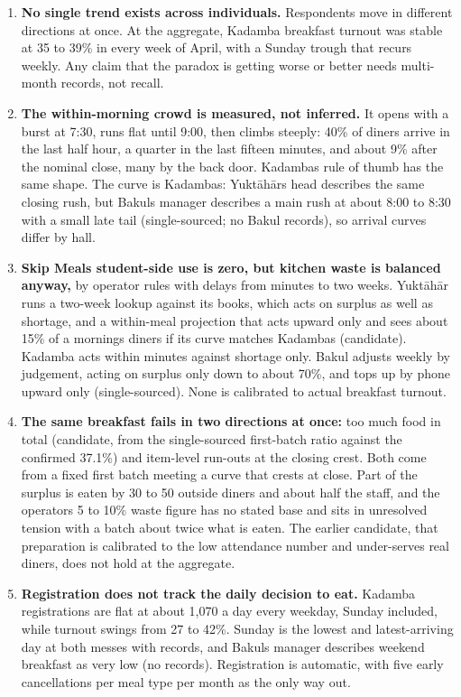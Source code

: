 \documentclass[
  10pt,
  table]{article}
\providecommand{\tightlist}{%
  \setlength{\itemsep}{0pt}\setlength{\parskip}{0pt}}
\renewcommand{\tightlist}{\setlength{\itemsep}{1.5pt}\setlength{\parskip}{0pt}}
\begin{document}
\begin{enumerate}
\def\labelenumi{\arabic{enumi}.}
\tightlist
\item
  \textbf{No single trend exists across individuals.} Respondents move in different directions at once. At the aggregate, Kadamba breakfast turnout was stable at 35 to 39\% in every week of April, with a Sunday trough that recurs weekly. Any claim that the paradox is getting worse or better needs multi-month records, not recall.
\item
  \textbf{The within-morning crowd is measured, not inferred.} It opens with a burst at 7:30, runs flat until 9:00, then climbs steeply: 40\% of diners arrive in the last half hour, a quarter in the last fifteen minutes, and about 9\% after the nominal close, many by the back door. Kadamba\textquotesingle s rule of thumb has the same shape. The curve is Kadamba\textquotesingle s: Yuktāhār\textquotesingle s head describes the same closing rush, but Bakul\textquotesingle s manager describes a main rush at about 8:00 to 8:30 with a small late tail (single-sourced; no Bakul records), so arrival curves differ by hall.
\item
  \textbf{Skip Meal\textquotesingle s student-side use is zero, but kitchen waste is balanced anyway,} by operator rules with delays from minutes to two weeks. Yuktāhār runs a two-week lookup against its books, which acts on surplus as well as shortage, and a within-meal projection that acts upward only and sees about 15\% of a morning\textquotesingle s diners if its curve matches Kadamba\textquotesingle s (candidate). Kadamba acts within minutes against shortage only. Bakul adjusts weekly by judgement, acting on surplus only down to about 70\%, and tops up by phone upward only (single-sourced). None is calibrated to actual breakfast turnout.
\item
  \textbf{The same breakfast fails in two directions at once:} too much food in total (candidate, from the single-sourced first-batch ratio against the confirmed 37.1\%) and item-level run-outs at the closing crest. Both come from a fixed first batch meeting a curve that crests at close. Part of the surplus is eaten by 30 to 50 outside diners and about half the staff, and the operator\textquotesingle s 5 to 10\% waste figure has no stated base and sits in unresolved tension with a batch about twice what is eaten. The earlier candidate, that preparation is calibrated to the low attendance number and under-serves real diners, does not hold at the aggregate.
\item
  \textbf{Registration does not track the daily decision to eat.} Kadamba registrations are flat at about 1,070 a day every weekday, Sunday included, while turnout swings from 27 to 42\%. Sunday is the lowest and latest-arriving day at both messes with records, and Bakul\textquotesingle s manager describes weekend breakfast as very low (no records). Registration is automatic, with five early cancellations per meal type per month as the only way out.

\end{enumerate}
\end{document}
